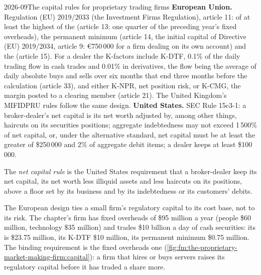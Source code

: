 \begin{dated}{2026-09}{The capital rules for proprietary trading firms}\label{dat:fm:the-proprietary-market-making-firm:rules}
\textbf{European Union.} Regulation (EU) 2019/2033 (the Investment Firms Regulation), article 11:  of at least the highest of the  (article 13: one quarter of the preceding year's fixed overheads), the permanent minimum (article 14, the initial capital
of Directive (EU) 2019/2034, article 9: \euro750\,000 for a firm dealing on its own account) and the  (article 15). For a dealer
the K-factors include K-DTF, 0.1\% of the daily trading flow in cash trades and 0.01\% in derivatives, the flow being the average of daily
absolute buys and sells over six months that end three months before the calculation (article 33), and either K-NPR, net position risk, or
K-CMG, the margin posted to a clearing member (article 21). The United Kingdom's MIFIDPRU rules follow the same design.
\textbf{United States.} SEC Rule 15c3-1: a broker-dealer's net capital is its net worth adjusted by, among other things, haircuts on its securities
positions; aggregate indebtedness may not exceed 1\,500\% of net capital, or, under the alternative standard, net capital must be at least the
greater of \$250\,000 and 2\% of aggregate debit items; a dealer keeps at least \$100\,000.
\end{dated}

\begin{definition}\label{def:fm:the-proprietary-market-making-firm:netcap}
The \emph{net capital rule} is the United States requirement that a broker-dealer keep its net capital, its net worth less
illiquid assets and less haircuts on its positions, above a floor set by its business and by its indebtedness or its customers' debits.
\end{definition}

The European design ties a small firm's regulatory capital to its cost base, not to its risk. The chapter's firm has fixed overheads of \$95
million a year (people \$60 million, technology \$35 million) and trades \$10 billion a day of cash securities: its 
is \$23.75 million, its K-DTF \$10 million, its permanent minimum \$0.75 million. The binding requirement is the fixed overheads one
(\cref{fig:fm:the-proprietary-market-making-firm:capital}): a firm that hires or buys servers raises its regulatory capital before it has traded a
share more.

